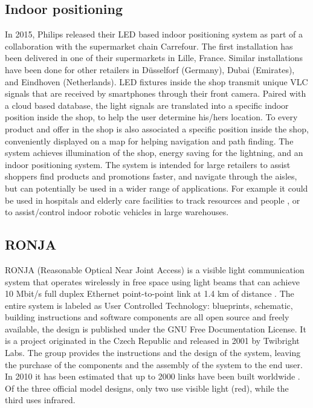 \subsection{Indoor positioning}
In 2015, Philips released their LED based indoor positioning system as part of a collaboration with the supermarket chain Carrefour\cite{philps}.
The first installation has been delivered in one of their supermarkets in Lille, France.
Similar installations have been done for other retailers in D\"usselforf (Germany), Dubai (Emirates), and Eindhoven (Netherlands).
LED fixtures inside the shop transmit unique VLC signals that are received by smartphones through their front camera.
Paired with a cloud based database, the light signals are translated into a specific indoor position inside the shop, to help the user determine his/hers location.
To every product and offer in the shop is also associated a specific position inside the shop, conveniently displayed on a map for helping navigation and path finding. 
The system achieves illumination of the shop, energy saving for the lightning, and an indoor positioning system.
The system is intended for large retailers to assist shoppers find products and promotions faster, and navigate through the aisles, but can potentially be used in a wider range of applications.
For example it could be used in hospitals and elderly care facilities to track resources and people \cite{arduinobasedindoors}, or to assist/control indoor robotic vehicles in large warehouses.

\subsection{RONJA}
RONJA (Reasonable Optical Near Joint Access) is a visible light communication system that operates wirelessly in free space using light beams that can achieve 10 Mbit/s full duplex Ethernet point-to-point link at 1.4 km of distance \cite{ronja}.
The entire system is labeled as User Controlled Technology: blueprints, schematic, building instructions and software components are all open source and freely available, the design is published under the GNU Free Documentation License.
It is a project originated in the Czech Republic and released in 2001 by Twibright Labs.
The group provides the instructions and the design of the system, leaving the purchase of the components and the assembly of the system to the end user.
In 2010 it has been estimated that up to 2000 links have been built worldwide \cite{ronjaestimation}.
Of the three official model designs, only two use visible light (red), while the third uses infrared.

